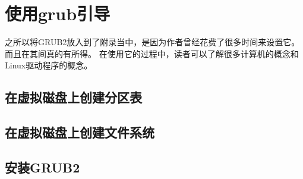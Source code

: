 \chapter{使用grub引导}
之所以将GRUB2放入到了附录当中，是因为作者曾经花费了很多时间来设置它。
而且在其间真的有所得。
在使用它的过程中，读者可以了解很多计算机的概念和Linux驱动程序的概念。

\section{在虚拟磁盘上创建分区表}
\section{在虚拟磁盘上创建文件系统}
\section{安装GRUB2}

